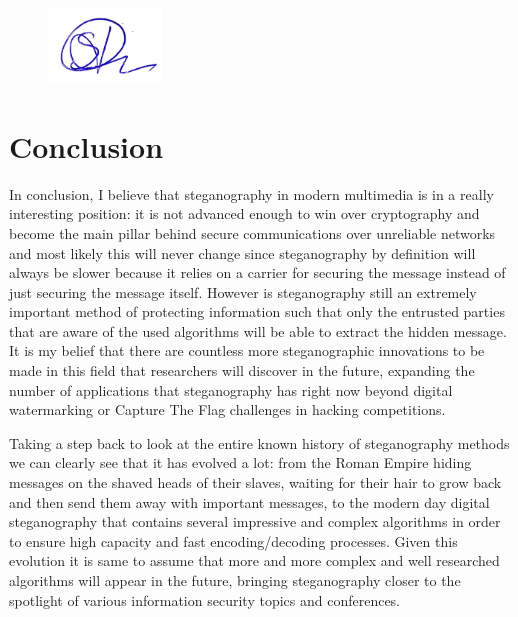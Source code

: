 \documentclass[notitlepage]{report}
\begin{document}
\begin{figure}[hb!]
  \includegraphics[width=3cm]{pics/semnatura}
\end{figure}

\tableofcontents{}







\clearpage
\chapter{Conclusion}
In conclusion, I believe that steganography in modern multimedia is in a really interesting position: it is not advanced enough to win over cryptography and become the main pillar behind secure communications over unreliable networks and most likely this will never change since steganography by definition will always be slower because it relies on a carrier for securing the message instead of just securing the message itself. However is steganography still an extremely important method of protecting information such that only the entrusted parties that are aware of the used algorithms will be able to extract the hidden message. It is my belief that there are countless more steganographic innovations to be made in this field that researchers will discover in the future, expanding the number of applications that steganography has right now beyond digital watermarking or Capture The Flag challenges in hacking competitions. 

Taking a step back to look at the entire known history of steganography methods we can clearly see that it has evolved a lot: from the Roman Empire hiding messages on the shaved heads of their slaves, waiting for their hair to grow back and then send them away with important messages, to the modern day digital steganography that contains several impressive and complex algorithms in order to ensure high capacity and fast encoding/decoding processes. Given this evolution it is same to assume that more and more complex and well researched algorithms will appear in the future, bringing steganography closer to the spotlight of various information security topics and conferences.



\restoregeometry
\end{document}
